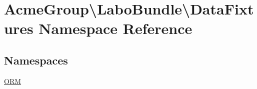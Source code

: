 \hypertarget{namespace_acme_group_1_1_labo_bundle_1_1_data_fixtures}{\section{Acme\+Group\textbackslash{}Labo\+Bundle\textbackslash{}Data\+Fixtures Namespace Reference}
\label{namespace_acme_group_1_1_labo_bundle_1_1_data_fixtures}
}
\subsection*{Namespaces}
\begin{DoxyCompactItemize}
\item 
 \hyperlink{namespace_acme_group_1_1_labo_bundle_1_1_data_fixtures_1_1_o_r_m}{O\+R\+M}
\end{DoxyCompactItemize}
